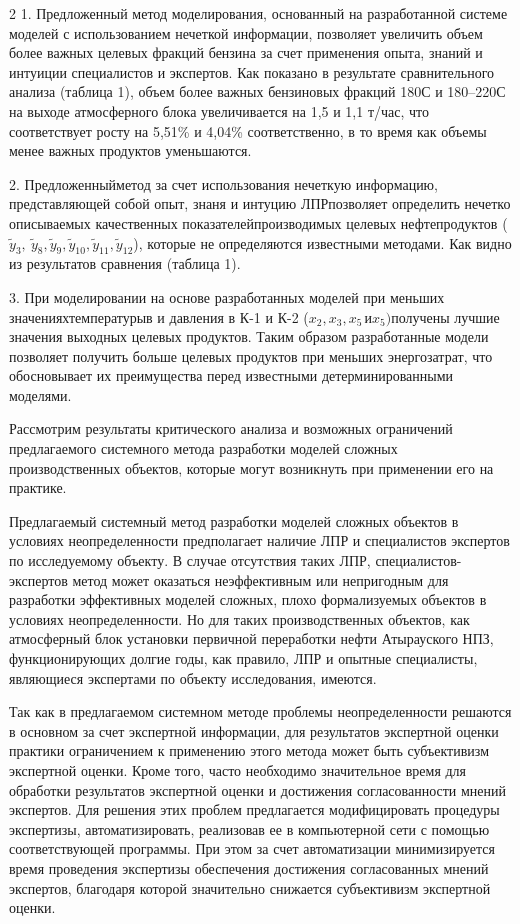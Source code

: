 \begin{multicols}{2}
1. Предложенный метод моделирования, основанный на разработанной системе
моделей с использованием нечеткой информации, позволяет увеличить объем
более важных целевых фракций бензина за счет применения опыта, знаний и
интуиции специалистов и экспертов. Как показано в результате
сравнительного анализа (таблица 1), объем более важных бензиновых
фракций 180С и 180--220С на выходе
атмосферного блока увеличивается на 1,5 и 1,1 т/час, что соответствует
росту на 5,51\% и 4,04\% соответственно, в то время как объемы менее
важных продуктов уменьшаются.

2. Предложенныйметод за счет использования нечеткую информацию,
представляющей собой опыт, знаня и интуцию ЛПРпозволяет определить
нечетко описываемых качественных показателейпроизводимых целевых
нефтепродуктов
(\({\widetilde{y}}_{3},\ {\widetilde{y}}_{8},{\widetilde{y}}_{9},{\widetilde{y}}_{10},{\widetilde{y}}_{11},{\widetilde{y}}_{12}\)),
которые не определяются известными методами. Как видно из результатов
сравнения (таблица 1).

3. При моделировании на основе разработанных моделей при меньших
значенияхтемпературыв и давления в К-1 и К-2
(\(x_{2},x_{3},x_{5\ }иx_{5})\)получены лучшие значения выходных целевых
продуктов. Таким образом разработанные модели позволяет получить больше
целевых продуктов при меньших энергозатрат, что обосновывает их
преимущества перед известными детерминированными моделями.

Рассмотрим результаты критического анализа и возможных ограничений
предлагаемого системного метода разработки моделей сложных
производственных объектов, которые могут возникнуть при применении его
на практике.

Предлагаемый системный метод разработки моделей сложных объектов в
условиях неопределенности предполагает наличие ЛПР и специалистов
экспертов по исследуемому объекту. В случае отсутствия таких ЛПР,
специалистов-экспертов метод может оказаться неэффективным или
непригодным для разработки эффективных моделей сложных, плохо
формализуемых объектов в условиях неопределенности. Но для таких
производственных объектов, как атмосферный блок установки первичной
переработки нефти Атырауского НПЗ, функционирующих долгие годы, как
правило, ЛПР и опытные специалисты, являющиеся экспертами по объекту
исследования, имеются.

Так как в предлагаемом системном методе проблемы неопределенности
решаются в основном за счет экспертной информации, для результатов
экспертной оценки практики ограничением к применению этого метода может
быть субъективизм экспертной оценки. Кроме того, часто необходимо
значительное время для обработки результатов экспертной оценки и
достижения согласованности мнений экспертов. Для решения этих проблем
предлагается модифицировать процедуры экспертизы, автоматизировать,
реализовав ее в компьютерной сети с помощью соответствующей программы.
При этом за счет автоматизации минимизируется время проведения
экспертизы обеспечения достижения согласованных мнений экспертов,
благодаря которой значительно снижается субъективизм экспертной оценки.
\end{multicols}

